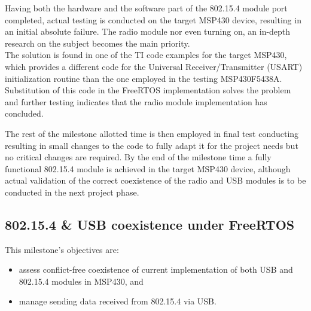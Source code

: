 \begin{enumerate}
		Having both the hardware and the software part of the 802.15.4 module port completed, actual testing is conducted on the target MSP430 device, resulting in an initial absolute failure. The radio module nor even turning on, an in-depth research on the subject becomes the main priority.\\

		The solution is found in one of the TI code examples for the target MSP430, which provides a different code for the Universal Receiver/Transmitter (USART) initialization routine than the one employed in the testing MSP430F5438A. Substitution of this code in the FreeRTOS implementation solves the problem and further testing indicates that the radio module implementation has concluded.\\

		\end{enumerate}

		The rest of the milestone allotted time is then employed in final test conducting resulting in small changes to the code to fully adapt it for the project needs but no critical changes are required. By the end of the milestone time a fully functional 802.15.4 module is achieved in the target MSP430 device, although actual validation of the correct coexistence of the radio and USB modules is to be conducted in the next project phase.\\

		\subsection{802.15.4 \& USB coexistence under FreeRTOS}
		\label{ssec:802.15.4.USB.FreeRTOS}	
		This milestone's objectives are:
		\begin{itemize}
		\item assess conflict-free coexistence of current implementation of both USB and 802.15.4 modules in MSP430, and
		\item manage sending data received from 802.15.4 via USB.
		\end{itemize}
		
		
